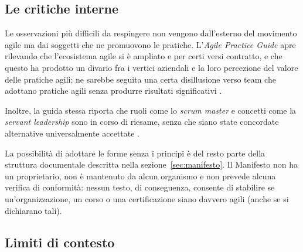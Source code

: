 \subsection{Le critiche interne}

Le osservazioni pi\`u difficili da respingere non vengono dall'esterno del
movimento agile ma dai soggetti che ne promuovono le pratiche.
L'\emph{Agile Practice Guide} apre rilevando che l'ecosistema agile si \`e
ampliato e per certi versi contratto, e che questo ha prodotto un divario fra i
vertici aziendali e la loro percezione del valore delle pratiche agili; ne
sarebbe seguita una certa disillusione verso team che adottano pratiche agili
senza produrre risultati significativi \cite{agilepracticeguide2}.

Inoltre, la guida stessa riporta che ruoli come lo \emph{scrum master} e
concetti come la \emph{servant leadership} sono in corso di riesame, senza che
siano state concordate alternative universalmente accettate
\cite{agilepracticeguide2}.

La possibilit\`a di adottare le forme senza i principi \`e del resto parte
della struttura documentale descritta nella sezione~\ref{sec:manifesto}. Il
Manifesto non ha un proprietario, non \`e mantenuto da alcun organismo e non
prevede alcuna verifica di conformit\`a: nessun testo, di conseguenza, consente
di stabilire se un'organizzazione, un corso o una certificazione siano davvero
agili (anche se si dichiarano tali).

\subsection{Limiti di contesto}

